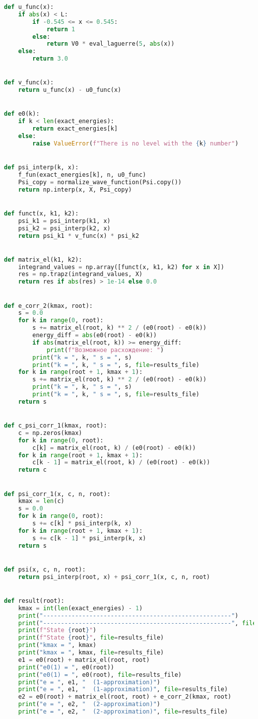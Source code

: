 \begin{lstlisting}[language=Python, caption=Код файла solver.py,label={lst:solver}]
def u_func(x):
    if abs(x) < L:
        if -0.545 <= x <= 0.545:
            return 1
        else:
            return V0 * eval_laguerre(5, abs(x))
    else:
        return 3.0


def v_func(x):
    return u_func(x) - u0_func(x)


def e0(k):
    if k < len(exact_energies):
        return exact_energies[k]
    else:
        raise ValueError(f"There is no level with the {k} number")


def psi_interp(k, x):
    f_fun(exact_energies[k], n, u0_func)
    Psi_copy = normalize_wave_function(Psi.copy())
    return np.interp(x, X, Psi_copy)


def funct(x, k1, k2):
    psi_k1 = psi_interp(k1, x)
    psi_k2 = psi_interp(k2, x)
    return psi_k1 * v_func(x) * psi_k2


def matrix_el(k1, k2):
    integrand_values = np.array([funct(x, k1, k2) for x in X])
    res = np.trapz(integrand_values, X)
    return res if abs(res) > 1e-14 else 0.0


def e_corr_2(kmax, root):
    s = 0.0
    for k in range(0, root):
        s += matrix_el(root, k) ** 2 / (e0(root) - e0(k))
        energy_diff = abs(e0(root) - e0(k))
        if abs(matrix_el(root, k)) >= energy_diff:
            print(f"Возможное расхождение: ")
        print("k = ", k, " s = ", s)
        print("k = ", k, " s = ", s, file=results_file)
    for k in range(root + 1, kmax + 1):
        s += matrix_el(root, k) ** 2 / (e0(root) - e0(k))
        print("k = ", k, " s = ", s)
        print("k = ", k, " s = ", s, file=results_file)
    return s


def c_psi_corr_1(kmax, root):
    c = np.zeros(kmax)
    for k in range(0, root):
        c[k] = matrix_el(root, k) / (e0(root) - e0(k))
    for k in range(root + 1, kmax + 1):
        c[k - 1] = matrix_el(root, k) / (e0(root) - e0(k))
    return c


def psi_corr_1(x, c, n, root):
    kmax = len(c)
    s = 0.0
    for k in range(0, root):
        s += c[k] * psi_interp(k, x)
    for k in range(root + 1, kmax + 1):
        s += c[k - 1] * psi_interp(k, x)
    return s


def psi(x, c, n, root):
    return psi_interp(root, x) + psi_corr_1(x, c, n, root)


def result(root):
    kmax = int(len(exact_energies) - 1)
    print("-----------------------------------------------------")
    print("-----------------------------------------------------", file=results_file)
    print(f"State {root}")
    print(f"State {root}", file=results_file)
    print("kmax = ", kmax)
    print("kmax = ", kmax, file=results_file)
    e1 = e0(root) + matrix_el(root, root)
    print("e0(1) = ", e0(root))
    print("e0(1) = ", e0(root), file=results_file)
    print("e = ", e1, "  (1-approximation)")
    print("e = ", e1, "  (1-approximation)", file=results_file)
    e2 = e0(root) + matrix_el(root, root) + e_corr_2(kmax, root)
    print("e = ", e2, "  (2-approximation)")
    print("e = ", e2, "  (2-approximation)", file=results_file)


\end{lstlisting}

